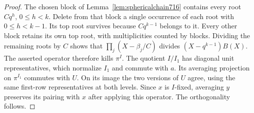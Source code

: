 \documentclass[a4paper,11pt]{article}
\theoremstyle{definition}
\theoremstyle{remark}
\numberwithin{equation}{section}
\begin{document}
\begin{proof}
The chosen block of Lemma~\ref{lem:sphericalchain716} contains
every root \(Cq^h\), \(0\le h<k\). Delete from that block a
single occurrence of each root with \(0\le h<k-1\). Its top
root survives because \(Cq^{k-1}\) belongs to it. Every
other block retains its own top root, with multiplicities
counted by blocks. Dividing the remaining roots by \(C\)
shows that \(\prod_j(X-\beta_j/C)\) divides
\((X-q^{k-1})B(X)\). The asserted operator therefore kills
\(\pi^I\). The quotient \(I/I_1\) has diagonal unit
representatives, which normalize \(I_1\) and commute with
\(a\). Its averaging projection on \(\pi^{I_1}\) commutes
with \(U\). On its image the two versions of \(U\) agree,
using the same first-row representatives at both levels.
Since \(x\) is \(I\)-fixed, averaging \(y\) preserves its
pairing with \(x\) after applying this operator. The
orthogonality follows.
\end{proof}
\end{document}
